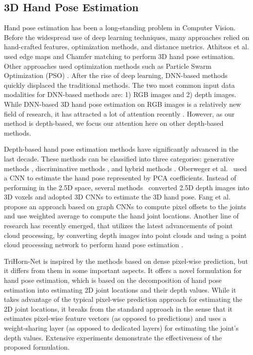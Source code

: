 \documentclass{article}
\begin{document}
\subsection{3D Hand Pose Estimation}
Hand pose estimation has been a long-standing problem in Computer Vision. Before the widespread use of deep learning techniques, many approaches relied on hand-crafted features, optimization methods, and distance metrics. Athitsos et al. \cite{athitsos2003estimating} used edge maps and Chamfer matching to perform 3D hand pose estimation. Other approaches used optimization methods such as Particle Swarm Optimization (PSO) \cite{sharp2015accurate,oikonomidis2011efficient}. After the rise of deep learning, DNN-based methods quickly displaced the traditional methods. The two most common input data modalities for DNN-based methods are: 1) RGB images and 2) depth images. While DNN-based 3D hand pose estimation on RGB images is a relatively new field of research, it has attracted a lot of attention recently \cite{zimmermann2017learning,tang2021towards,zhou2020monocular,ge20193d,baek2019pushing,zhang2021hand,moon2020deephandmesh,moon2020i2l,spurr2020weakly}. However, as our method is depth-based, we focus our attention here on other depth-based methods.
\par
Depth-based hand pose estimation methods have significantly advanced in the last decade. These methods can be classified into three categories: generative methods \cite{khamis2015learning,romero2017embodied,tkach2017online,tzionas2016capturing}, discriminative methods \cite{keskin2012hand,liang2014parsing}, and hybrid methods \cite{sharp2015accurate,tang2015opening,taylor2016efficient}. Oberweger et al.~\cite{oberweger2015hands} used a CNN to estimate the hand pose represented by PCA coefficients. Instead of performing in the 2.5D space, several methods~\cite{ge20173d,moon2018v2v} converted 2.5D depth images into 3D voxels and adopted 3D CNNs to estimate the 3D hand pose. Fang et al.~\cite{fang2020jgr} propose an approach based on graph CNNs to compute pixel offsets to the joints and use weighted average to compute the hand joint locations. Another line of research has recently emerged, that utilizes the latest advancements of point cloud processing, by converting depth images into point clouds and using a point cloud processing network to perform hand pose estimation \cite{ge2018hand,ge2018point,li2019point,chen2019so,cheng2021handfoldingnet,huang2020hand}.
\par
TriHorn-Net is inspired by the methods based on dense pixel-wise prediction, but it differs from them in some important aspects. It offers a novel formulation for hand pose estimation, which is based on the decomposition of hand pose estimation into estimating 2D joint locations and their depth values. While it takes advantage of the typical pixel-wise prediction approach for estimating the 2D joint locations, it breaks from the standard approach in the sense that it estimates pixel-wise feature vectors (as opposed to predictions) and uses a weight-sharing layer (as opposed to dedicated layers) for estimating the joint's depth values. Extensive experiments demonstrate the effectiveness of the proposed formulation.
\end{document}
